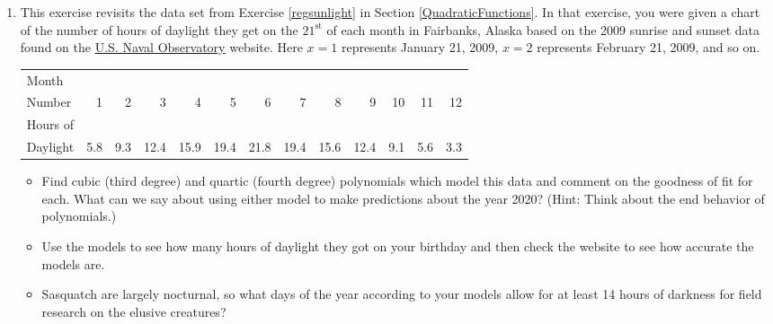 \newpage

\begin{enumerate}
\setcounter{enumi}{\value{HW}}


\item \label{sunlighthigherorder} This exercise revisits the data set from Exercise \ref{regsunlight} in Section \ref{QuadraticFunctions}.  In that exercise, you were given a chart of the number of hours of daylight they get on the $21^{\mbox{st}}$ of each month in Fairbanks, Alaska based on the 2009 sunrise and sunset data found on the  \href{http://aa.usno.navy.mil/data/docs/RS_OneYear.php}{\underline{U.S. Naval Observatory}} website.  Here  $x = 1$ represents January 21, 2009, $x = 2$ represents February 21, 2009, and so on.  
\medskip

\small

\noindent \begin{tabular}{|l|r|r|r|r|r|r|r|r|r|r|r|r|} \hline
Month  & & & & & & & & & & & & \\
Number & 1 & 2 & 3 & 4 & 5 & 6 & 7 & 8 & 9 & 10 & 11 & 12\\ 
\hline 
Hours of  & & & & & & & & & & & & \\
Daylight & 5.8 & 9.3 & 12.4 & 15.9 & 19.4 & 21.8 & 19.4 & 15.6 & 12.4 & 9.1 & 5.6 & 3.3 \\ \hline
\end{tabular}

\normalsize

\medskip

\noindent 

\begin{itemize}

\item Find cubic (third degree) and quartic (fourth degree) polynomials which model this data and comment on the goodness of fit for each.  What can we say about using either model to make predictions about the year 2020?  (Hint: Think about the end behavior of polynomials.)  

\item Use the models to see how many hours of daylight they got on your birthday and then check the website to see how accurate the models are.  

\item Sasquatch are largely nocturnal, so what days of the year according to your models  allow for at least 14 hours of darkness for field research on the elusive creatures? 

\end{itemize}


\end{enumerate}
